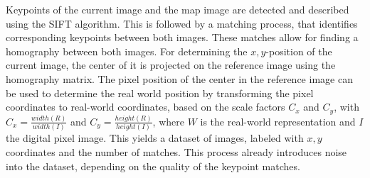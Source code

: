 Keypoints of the current image and the map image are detected and
described using the SIFT algorithm. This is followed by a matching
process, that identifies corresponding keypoints between both
images. These matches allow for finding a homography between both
images. For determining the $x, y$-position of the current image, the
center of it is projected on the reference image using the homography
matrix. The pixel position of the center in the reference image can be
used to determine the real world position by transforming the pixel
coordinates to real-world coordinates, based on the scale factors
$C_x$ and $C_y$, with $C_x = \frac{width(R)}{width(I)}$ and
$C_y = \frac{height(R)}{height(I)}$, where $W$ is the real-world
representation and $I$ the digital pixel image. This yields a dataset
of images, labeled with $x, y$ coordinates and the number of
matches. This process already introduces noise into the dataset, depending on the quality of the keypoint matches.